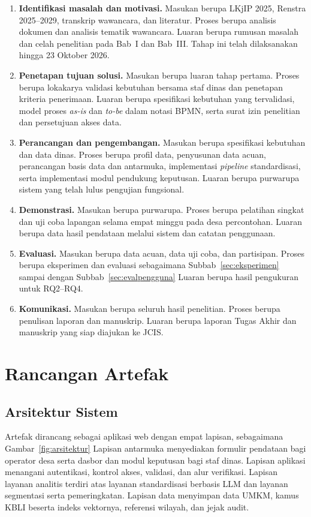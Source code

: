 \documentclass[12pt,a4paper]{report}
\begin{document}
\begin{enumerate}
  \item \textbf{Identifikasi masalah dan motivasi.} Masukan berupa LKjIP 2025, Renstra 2025--2029, transkrip wawancara, dan literatur. Proses berupa analisis dokumen dan analisis tematik wawancara. Luaran berupa rumusan masalah dan celah penelitian pada Bab~I dan Bab~III. Tahap ini telah dilaksanakan hingga 23 Oktober 2026.
  \item \textbf{Penetapan tujuan solusi.} Masukan berupa luaran tahap pertama. Proses berupa lokakarya validasi kebutuhan bersama staf dinas dan penetapan kriteria penerimaan. Luaran berupa spesifikasi kebutuhan yang tervalidasi, model proses \textit{as-is} dan \textit{to-be} dalam notasi BPMN, serta surat izin penelitian dan persetujuan akses data.
  \item \textbf{Perancangan dan pengembangan.} Masukan berupa spesifikasi kebutuhan dan data dinas. Proses berupa profil data, penyusunan data acuan, perancangan basis data dan antarmuka, implementasi \textit{pipeline} standardisasi, serta implementasi modul pendukung keputusan. Luaran berupa purwarupa sistem yang telah lulus pengujian fungsional.
  \item \textbf{Demonstrasi.} Masukan berupa purwarupa. Proses berupa pelatihan singkat dan uji coba lapangan selama empat minggu pada desa percontohan. Luaran berupa data hasil pendataan melalui sistem dan catatan penggunaan.
  \item \textbf{Evaluasi.} Masukan berupa data acuan, data uji coba, dan partisipan. Proses berupa eksperimen dan evaluasi sebagaimana Subbab~\ref{sec:eksperimen} sampai dengan Subbab~\ref{sec:evalpengguna} Luaran berupa hasil pengukuran untuk RQ2--RQ4.
  \item \textbf{Komunikasi.} Masukan berupa seluruh hasil penelitian. Proses berupa penulisan laporan dan manuskrip. Luaran berupa laporan Tugas Akhir dan manuskrip yang siap diajukan ke JCIS.
\end{enumerate}

\section{Rancangan Artefak}
\label{sec:artefak}

\subsection{Arsitektur Sistem}

Artefak dirancang sebagai aplikasi web dengan empat lapisan, sebagaimana Gambar~\ref{fig:arsitektur} Lapisan antarmuka menyediakan formulir pendataan bagi operator desa serta dasbor dan modul keputusan bagi staf dinas. Lapisan aplikasi menangani autentikasi, kontrol akses, validasi, dan alur verifikasi. Lapisan layanan analitis terdiri atas layanan standardisasi berbasis LLM dan layanan segmentasi serta pemeringkatan. Lapisan data menyimpan data UMKM, kamus KBLI beserta indeks vektornya, referensi wilayah, dan jejak audit.
\end{document}
